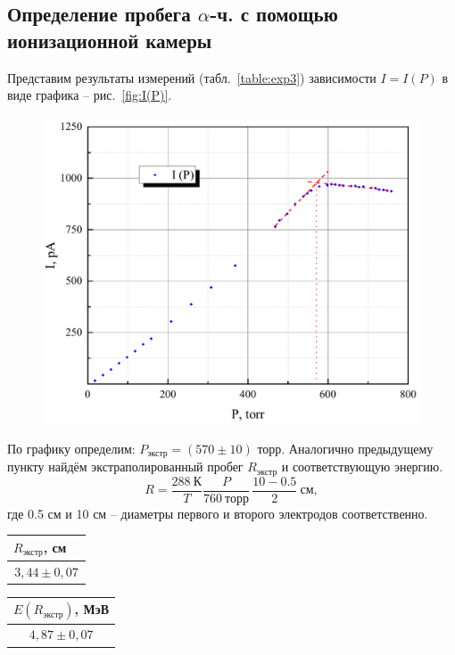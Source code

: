 \documentclass[a4paper,12pt]{article} %
\begin{document}
		\subsection{Определение пробега $\alpha$-ч. с помощью ионизационной камеры}
			Представим результаты измерений (табл.~\ref{table:exp3}) зависимости $I=I(P)$ в виде графика -- рис.~\ref{fig:I(P)}. 
		
		\begin{figure}[h!]
			\begin{floatrow}
				{\includegraphics[scale=0.5]{graph3.pdf}}    
			\end{floatrow}
		\end{figure}
		
		По графику определим: $P_\text{экстр} = (570 \pm 10)$ торр. Аналогично предыдущему пункту найдём экстраполированный пробег $R_\text{экстр}$ и соответствующую энергию.
		\begin{equation*}
			R = \frac{288 \ \text{К}}{T}\frac{P}{760 \ \text{торр}}\, \frac{10 - 0.5}{2} \ \text{см},
		\end{equation*}
		где 0.5 см и 10 см -- диаметры первого и второго электродов соответственно.
		\begin{table}[h!]
			\begin{floatrow}
				\ttabbox[\FBwidth]{\caption{$R$.}\label{tab:R3}}%
				{\begin{tabular}{|c|}
						\hline
						$R_\text{экстр}$, см $\ \ \ $ \\ \hline
						$3,44 \pm 0,07$         \\ \hline
				\end{tabular}}
				\ttabbox[\FBwidth]{\caption{$E$.}\label{tab:E3}}%
				{\begin{tabular}{|c|}
						\hline
						$E(R_\text{экстр})$, МэВ \\ \hline
						$4,87 \pm 0,07 $            \\ \hline
				\end{tabular}}        
			\end{floatrow}
		\end{table}
\newpage
\end{document}
